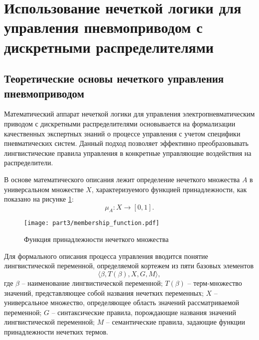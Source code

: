 \section{Использование нечеткой логики для управления пневмоприводом с дискретными распределителями}\label{sec:ch3/sec4}
\subsection*{Теоретические основы нечеткого управления пневмоприводом}\label{subsec:ch3/sec4/sub1}

Математический аппарат нечеткой логики для управления электропневматическим приводом
с дискретными распределителями основывается на формализации качественных экспертных знаний
о процессе управления с учетом специфики пневматических систем. Данный подход позволяет эффективно
преобразовывать лингвистические правила управления в конкретные управляющие воздействия на распределители.

В основе математического описания лежит определение нечеткого множества $A$ в
универсальном множестве $X$, характеризуемого
функцией принадлежности, как показано на рисунке \ref{fig:membership_functions}:
\begin{equation}
	\mu_A: X \rightarrow \left[0,1\right].
\end{equation}

\begin{figure}[ht]
	\centering
	\texttt{[image: part3/membership\_function.pdf]}
	\caption{Функция принадлежности нечеткого множества}
	\label{fig:membership_functions}
\end{figure}

Для формального описания процесса управления вводится понятие лингвистической переменной,
определяемой кортежем из пяти базовых элементов
\begin{equation}
	\langle \beta, T(\beta), X, G, M \rangle,
\end{equation}
где $\beta$ -- наименование лингвистической переменной;
$T(\beta)$ -- терм-множество значений, представляющее собой названия нечетких переменных;
$X$ -- универсальное множество, определяющее область значений рассматриваемой переменной;
$G$ -- синтаксические правила, порождающие названия значений лингвистической переменной;
$M$ -- семантические правила, задающие функции принадлежности нечетких термов.


